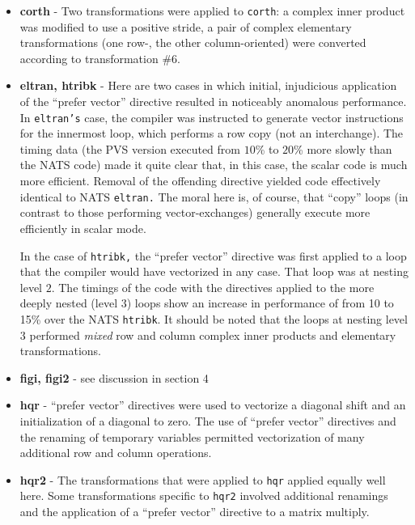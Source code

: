 \begin{itemize}
\item {\bf corth} -
	Two transformations were applied to {\tt corth}:
     a complex inner product was modified to use a positive stride, 
     a pair of complex elementary transformations (one row-, the other
     column-oriented) were converted according to transformation \#6.

\item {\bf eltran, htribk} -
	Here are two cases in which initial, injudicious application of
	the ``prefer vector'' directive resulted in noticeably anomalous
	performance.
	In {\tt eltran's} case, the compiler was instructed to generate
     vector instructions for the innermost loop, which performs a
     row copy (not an interchange).  The timing data (the PVS version
	executed from $10$\% to $20$\% more slowly than the NATS code)
	made it quite clear that, in this case, the scalar code is much
	more efficient.  Removal of the offending directive yielded code
	effectively identical to NATS {\tt eltran.}  The moral here is,
	of course, that ``copy'' loops (in contrast to those performing
	vector-exchanges) generally execute more efficiently in scalar mode.

	In the case of {\tt htribk,} the ``prefer vector'' directive was first
	applied to a loop that the compiler would have vectorized in any case.
	That loop was at nesting level $2$.  The timings of the code with the
	directives applied to the more deeply nested (level $3$) loops show
	an increase in performance of from 10 to 15\% over the NATS {\tt htribk}.
     It should be noted that the loops at nesting level $3$ performed
	{\em mixed} row and column complex inner products and elementary
	transformations.

\item {\bf figi, figi2 } -
	see discussion in section 4

\item {\bf hqr   } -
	``prefer vector'' directives were used to vectorize a diagonal shift and an
     initialization of a diagonal to zero.  The use of ``prefer vector'' directives and
     the renaming of temporary variables permitted vectorization of
     many additional row and column operations.

\item {\bf hqr2  } -
	The transformations that were applied to {\tt hqr} applied
     equally well here.  Some transformations specific to {\tt hqr2}
     involved additional renamings and the application of a
	``prefer vector'' directive to a matrix multiply.


\end{itemize}
